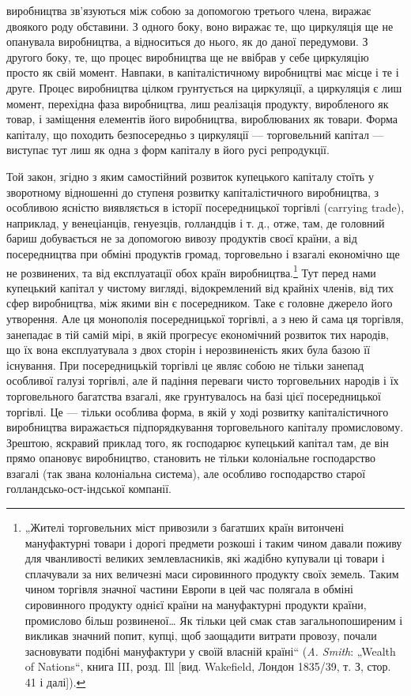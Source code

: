 \parcont{}  %
виробництва зв’язуються між собою за допомогою третього члена,
виражає двоякого роду обставини. З одного боку, воно виражає
те, що циркуляція ще не опанувала виробництва, а відноситься до
нього, як до даної передумови. З другого боку, те, що процес
виробництва ще не ввібрав у себе циркуляцію просто як свій
момент. Навпаки, в капіталістичному виробництві має місце і те
і друге. Процес виробництва цілком грунтується на циркуляції, а
циркуляція є лиш момент, перехідна фаза виробництва, лиш реалізація
продукту, виробленого як товар, і заміщення елементів
його виробництва, вироблюваних як товари. Форма капіталу, що
походить безпосередньо з циркуляції — торговельний капітал —
виступає тут лиш як одна з форм капіталу в його русі репродукції.

Той закон, згідно з яким самостійний розвиток купецького капіталу
стоїть у зворотному відношенні до ступеня розвитку капіталістичного
виробництва, з особливою ясністю виявляється в історії
посередницької торгівлі (carrying trade), наприклад, у венеціанців,
генуезців, голландців і т. д., отже, там, де головний бариш
добувається не за допомогою вивозу продуктів своєї країни,
а від посередництва при обміні продуктів громад, торговельно
і взагалі економічно ще не розвинених, та від експлуатації обох
країн виробництва.\footnote{
„Жителі торговельних міст привозили з багатших країн витончені мануфактурні
товари і дорогі предмети розкоші і таким чином давали поживу для
чванливості великих землевласників, які жадібно купували ці товари і сплачували
за них величезні маси сировинного продукту своїх земель. Таким чином торгівля
значної частини Европи в цей час полягала в обміні сировинного продукту
однієї країни на мануфактурні продукти країни, промислово більш розвиненої\dots{}
Як тільки цей смак став загальнопоширеним і викликав значний попит, купці,
щоб заощадити витрати провозу, почали засновувати подібні мануфактури
у своїй власній країні“ (\emph{A. Smith}: „Wealth of Nations“, книга III, розд. Ill [вид.
Wakefield, Лондон 1835/39, т. З, стор. 41 і далі]).
} Тут перед нами купецький капітал у чистому
вигляді, відокремлений від крайніх членів, від тих сфер
виробництва, між якими він є посередником. Таке є головне
джерело його утворення. Але ця монополія посередницької торгівлі,
а з нею й сама ця торгівля, занепадає в тій самій мірі,
в якій прогресує економічний розвиток тих народів, що їх вона
експлуатувала з двох сторін і нерозвиненість яких була базою
її існування. При посередницькій торгівлі це являє собою не
тільки занепад особливої галузі торгівлі, але й падіння переваги
чисто торговельних народів і їх торговельного багатства
взагалі, яке грунтувалось на базі цієї посередницької торгівлі.
Це — тільки особлива форма, в якій у ході розвитку капіталістичного
виробництва виражається підпорядкування торговельного
капіталу промисловому. Зрештою, яскравий приклад
того, як господарює купецький капітал там, де він прямо опановує
виробництво, становить не тільки колоніальне господарство
взагалі (так звана колоніальна система), але особливо господарство
старої голландсько-ост-індської компанії.
